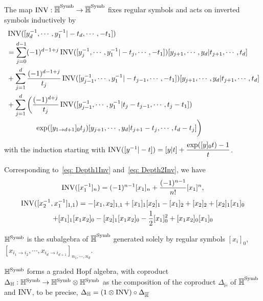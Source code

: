 \begin{definition}
The map $\operatorname{INV}:\overline{\mathbb H}^{\operatorname{Symb}}\to\overline{\mathbb H}^{\operatorname{Symb}}$ fixes regular symbols and acts on inverted symbols inductively by
\begin{equation}\label{eq: INV map}
\begin{aligned}
&\operatorname{INV}([y_d^{-1},\cdots,y_1^{-1}|-t_d,\cdots,-t_1])\\
&=\sum_{j=0}^{d-1}(-1)^{d-1+j}\operatorname{INV}([y_j^{-1},\cdots,y_1^{-1}|-t_j,\cdots,-t_1])[y_{j+1},\cdots,y_d|t_{j+1},\cdots,t_d]\\
&+\sum_{j=1}^d\frac{(-1)^{d-1+j}}{t_j}\operatorname{INV}([y_{j-1}^{-1},\cdots,y_1^{-1}|-t_{j-1},\cdots,-t_1])[y_{j+1},\cdots,y_d|t_{j+1},\cdots,t_d]\\
&+\sum_{j=1}^d\bigg(\frac{(-1)^{d+j}}{t_j}\operatorname{INV}([y_{j-1}^{-1},\cdots,y_1^{-1}|t_j-t_{j-1},\cdots,t_j-t_1])\\
&\qquad\qquad\exp([y_{1\to d+1}]_0t_j)[y_{j+1},\cdots,y_d|t_{j+1}-t_{j},\cdots,t_d-t_j]\bigg)
\end{aligned}
\end{equation}
with the induction starting with $\operatorname{INV}([y^{-1}|-t])=[y|t]+\dfrac{\exp([y]_0t)-1}{t}$.
\end{definition}

\begin{example}
Corresponding to~\eqref{eq: Depth1Inv} and~\eqref{eq: Depth2Inv}, we have
\[
\operatorname{INV}([x_1^{-1}]_n)=(-1)^{n-1}[x_1]_n+\dfrac{(-1)^{n-1}}{n!}[x_1]^n,
\]
\begin{multline}
\operatorname{INV}([x_2^{-1},x_1^{-1}]_{1,1})=-[x_1,x_2]_{1,1}+[x_1]_1[x_2]_1-[x_1]_2+[x_2]_2+[x_2]_1[x_1]_0\\
+[x_1]_1[x_1 x_2]_0-[x_2]_1[x_1 x_2]_0-\frac{1}{2}[x_1]_0^2+[x_1 x_2]_0[x_1]_0
\end{multline}
\end{example}

\begin{definition}
$\mathbb H^{\operatorname{Symb}}$ is the subalgebra of $\overline{\mathbb H}^{\operatorname{Symb}}$ generated solely by regular symbols $[x_{i}]_0$, $[x_{i_1\to i_2},\cdots,x_{i_d\to i_{d+1}}]_{n_1,\cdots,n_d}$.
\end{definition}

\begin{theorem}\label{thm: H is a Hopf algebra}
$\mathbb H^{\operatorname{Symb}}$ forms a graded Hopf algebra, with coproduct $\Delta_{\mathbb H}:\mathbb H^{\operatorname{Symb}}\to\mathbb H^{\operatorname{Symb}}\otimes\mathbb H^{\operatorname{Symb}}$ as the composition of the coproduct $\Delta_{\overline{\mathbb H}}$ of $\overline{\mathbb H}^{\operatorname{Symb}}$ and $\operatorname{INV}$, to be precise, $\Delta_{\mathbb H}=(1\otimes\operatorname{INV})\circ\Delta_{\overline{\mathbb H}}$
\end{theorem}

